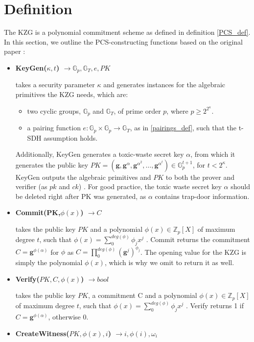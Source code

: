 \section*{Definition}
\label{Def}
The KZG is a polynomial commitment scheme as defined in definition \ref{PCS_def}. In this section, we outline the PCS-constructing functions based on the original paper \parencite{KZG}:
\begin{itemize}
    \item \textbf{KeyGen($\kappa,t$) $\rightarrow \mathbb{G}_p, \mathbb{G}_T, e, PK$} 
    
    takes a security parameter $\kappa$ and generates instances for the algebraic primitives the KZG needs, which are: 
    \begin{itemize}
        \item two cyclic groups, $\mathbb{G}_p$ and $\mathbb{G}_T$, of prime order $p$, where $p\ge2^{2^\kappa}$.
        \item a pairing function $e: \mathbb{G}_p \times \mathbb{G}_p \rightarrow \mathbb{G}_T$, as in \ref{pairings_def}, such that the t-SDH assumption holds.
    \end{itemize}
    \parencite{KZG}
    Additionally, KeyGen generates a toxic-waste secret key $\alpha$, from which it generates the public key $PK=(\mathbf{g}, \mathbf{g}^\alpha, \mathbf{g}^{\alpha^2},\dots,\mathbf{g}^{\alpha^t})\in \mathbb{G}_p^{t+1}$, for $t<2^\kappa$. KeyGen outputs the algebraic primitives and $PK$ to both the prover and verifier (as $pk$ and $ck$) \parencite{KZG}. 
    For good practice, the toxic waste secret key $\alpha$ should be deleted right after PK was generated, as $\alpha$ contains trap-door information. 
    \item \textbf{Commit(PK,$\phi(x)$) $\rightarrow C$}

    takes the public key $PK$ and a polynomial $\phi(x) \in \mathbb{Z}_p[X]$
    of maximum degree $t$, such that $\phi(x)=\sum_{0}^{deg(\phi)}\phi_jx^j$
    \parencite{KZG}. Commit returns the commitment $C=\mathbf{g}^{\phi(\alpha)}$ for $\phi$ as $C=\prod_{0}^{deg(\phi)}(\mathbf{g}^j)^{\phi_j}$\parencite{KZG}.
    The opening value for the KZG is simply the polynomial $\phi(x)$, which is why we omit to return it as well.

    \item \textbf{Verify($PK,C,\phi(x)$) $\rightarrow bool$}

    takes the public key $PK$, a commitment C and a polynomial $\phi(x) \in \mathbb{Z}_p[X]$ of maximum degree $t$, such that $\phi(x)=\sum_{0}^{deg(\phi)}\phi_jx^j$ \parencite{KZG}. Verify returns 1 if $C=\mathbf{g}^{\phi(\alpha)}$, otherwise 0.
    \item \textbf{CreateWitness($PK, \phi(x), i$) $\rightarrow i,\phi(i),\omega_i$ }


\end{itemize}
